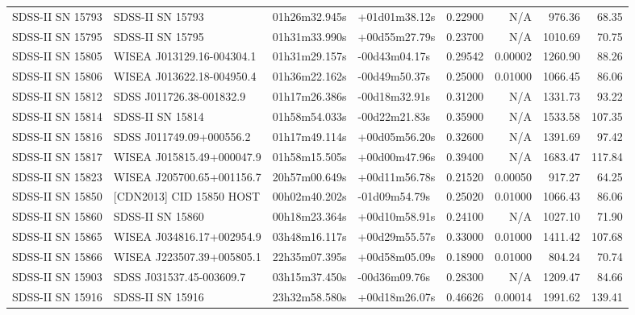\begin{longtable}{llllrrrr}
SDSS-II SN 15793 &                SDSS-II SN 15793 &   01h26m32.945s &   +01d01m38.12s &  0.22900 &      N/A &   976.36 &       68.35 \\
SDSS-II SN 15795 &                SDSS-II SN 15795 &   01h31m33.990s &   +00d55m27.79s &  0.23700 &      N/A &  1010.69 &       70.75 \\
SDSS-II SN 15805 &       WISEA J013129.16-004304.1 &   01h31m29.157s &   -00d43m04.17s &  0.29542 &  0.00002 &  1260.90 &       88.26 \\
SDSS-II SN 15806 &       WISEA J013622.18-004950.4 &   01h36m22.162s &   -00d49m50.37s &  0.25000 &  0.01000 &  1066.45 &       86.06 \\
SDSS-II SN 15812 &        SDSS J011726.38-001832.9 &   01h17m26.386s &   -00d18m32.91s &  0.31200 &      N/A &  1331.73 &       93.22 \\
SDSS-II SN 15814 &                SDSS-II SN 15814 &   01h58m54.033s &   -00d22m21.83s &  0.35900 &      N/A &  1533.58 &      107.35 \\
SDSS-II SN 15816 &        SDSS J011749.09+000556.2 &   01h17m49.114s &   +00d05m56.20s &  0.32600 &      N/A &  1391.69 &       97.42 \\
SDSS-II SN 15817 &       WISEA J015815.49+000047.9 &   01h58m15.505s &   +00d00m47.96s &  0.39400 &      N/A &  1683.47 &      117.84 \\
SDSS-II SN 15823 &       WISEA J205700.65+001156.7 &   20h57m00.649s &   +00d11m56.78s &  0.21520 &  0.00050 &   917.27 &       64.25 \\
SDSS-II SN 15850 &        [CDN2013] CID 15850 HOST &   00h02m40.202s &   -01d09m54.79s &  0.25020 &  0.01000 &  1066.43 &       86.06 \\
SDSS-II SN 15860 &                SDSS-II SN 15860 &   00h18m23.364s &   +00d10m58.91s &  0.24100 &      N/A &  1027.10 &       71.90 \\
SDSS-II SN 15865 &       WISEA J034816.17+002954.9 &   03h48m16.117s &   +00d29m55.57s &  0.33000 &  0.01000 &  1411.42 &      107.68 \\
SDSS-II SN 15866 &       WISEA J223507.39+005805.1 &   22h35m07.395s &   +00d58m05.09s &  0.18900 &  0.01000 &   804.24 &       70.74 \\
SDSS-II SN 15903 &        SDSS J031537.45-003609.7 &   03h15m37.450s &   -00d36m09.76s &  0.28300 &      N/A &  1209.47 &       84.66 \\
SDSS-II SN 15916 &                SDSS-II SN 15916 &   23h32m58.580s &   +00d18m26.07s &  0.46626 &  0.00014 &  1991.62 &      139.41 \\

\end{longtable}
